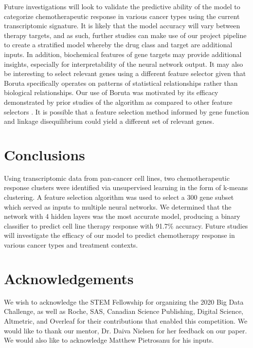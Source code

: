 \documentclass[10pt, letterpaper]{article}
\begin{document}
\begin{multicols*}{2}
Future investigations will look to validate the predictive ability of the model to categorize chemotherapeutic response in various cancer types using the current transcriptomic signature. It is likely that the model accuracy will vary between therapy targets, and as such, further studies can make use of our project pipeline to create a stratified model whereby the drug class and target are additional inputs. In addition, biochemical features of gene targets may provide additional insights, especially for interpretability of the neural network output. It may also be interesting to select relevant genes using a different feature selector given that Boruta specifically operates on patterns of statistical relationships rather than biological relationships. Our use of Boruta was motivated by its efficacy demonstrated by prior studies of the algorithm as compared to other feature selectors \cite{boruta, deep_cell}. It is possible that a feature selection method informed by gene function and linkage disequilibrium could yield a different set of relevant genes.


\section{Conclusions}
Using transcriptomic data from pan-cancer cell lines, two chemotherapeutic response clusters were identified via unsupervised learning in the form of k-means clustering. A feature selection algorithm was used to select a 300 gene subset which served as inputs to multiple neural networks. We determined that the network with 4 hidden layers was the most accurate model, producing a binary classifier to predict cell line therapy response with 91.7\% accuracy. Future studies will investigate the efficacy of our model to predict chemotherapy response in various cancer types and treatment contexts.


\section*{Acknowledgements}
We wish to acknowledge the STEM Fellowship for organizing the 2020 Big Data Challenge, as well as Roche, SAS, Canadian Science Publishing, Digital Science, Altmetric, and Overleaf for their contributions that enabled this competition. We would like to thank our mentor, Dr. Daiva Nielsen for her feedback on our paper. We would also like to acknowledge Matthew Pietrosanu for his inputs.




\end{multicols*}
\end{document}
